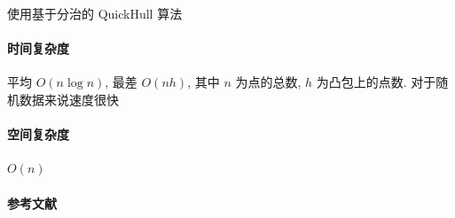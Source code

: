 使用基于分治的 QuickHull 算法

\paragraph{时间复杂度} 平均 \(O(n\log n)\), 最差 \(O(nh)\), 其中 \(n\) 为点的总数, \(h\) 为凸包上的点数. 对于随机数据来说速度很快

\paragraph{空间复杂度} \(O(n)\)

\paragraph{参考文献} \cite{barber1996quickhull}

